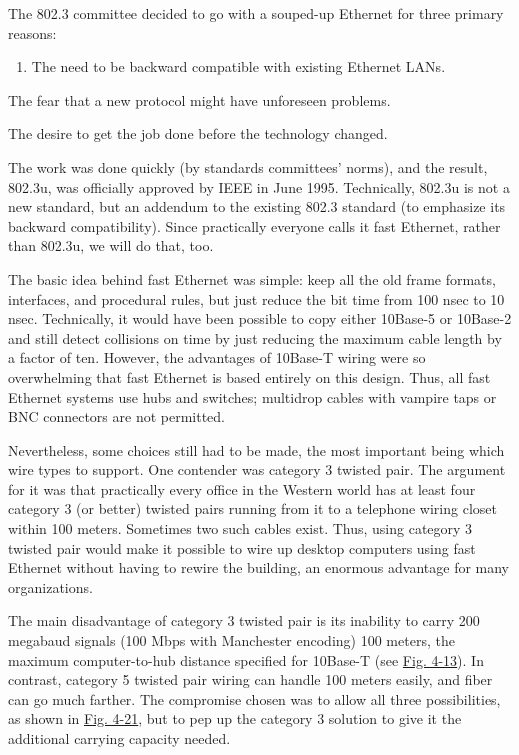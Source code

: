 \documentclass[b5paper,11pt]{memoir}
\begin{document}
The 802.3 committee decided to go with a souped-up Ethernet for three
primary reasons:

{}

\begin{enumerate}
\def\labelenumi{\arabic{enumi}.}
\item
  {}

  The need to be backward compatible with existing Ethernet LANs.
\end{enumerate}

{}

The fear that a new protocol might have unforeseen problems.

{}

The desire to get the job done before the technology changed.

The work was done quickly (by standards committees' norms), and the
result, {802.3u}, was officially approved by IEEE in June 1995.
Technically, 802.3u is not a new standard, but an addendum to the
existing 802.3 standard (to emphasize its backward compatibility). Since
practically everyone calls it {fast Ethernet}, rather than 802.3u, we
will do that, too.

The basic idea behind fast Ethernet was simple: keep all the old frame
formats, interfaces, and procedural rules, but just reduce the bit time
from 100 nsec to 10 nsec. Technically, it would have been possible to
copy either 10Base-5 or 10Base-2 and still detect collisions on time by
just reducing the maximum cable length by a factor of ten. However, the
advantages of 10Base-T wiring were so overwhelming that fast Ethernet is
based entirely on this design. Thus, all fast Ethernet systems use hubs
and switches; multidrop cables with vampire taps or BNC connectors are
not permitted.

Nevertheless, some choices still had to be made, the most important
being which wire types to support. One contender was category 3 twisted
pair. The argument for it was that practically every office in the
Western world has at least four category 3 (or better) twisted pairs
running from it to a telephone wiring closet within 100 meters.
Sometimes two such cables exist. Thus, using category 3 twisted pair
would make it possible to wire up desktop computers using fast Ethernet
without having to rewire the building, an enormous advantage for many
organizations.

The main disadvantage of category 3 twisted pair is its inability to
carry 200 megabaud signals (100 Mbps with Manchester encoding) 100
meters, the maximum computer-to-hub distance specified for 10Base-T (see
\protect\hyperlink{0130661023_ch04lev1sec3.htmlux5cux23ch04fig13}{Fig.
4-13}). In contrast, category 5 twisted pair wiring can handle 100
meters easily, and fiber can go much farther. The compromise chosen was
to allow all three possibilities, as shown in
\protect\hyperlink{0130661023_ch04lev1sec3.htmlux5cux23ch04fig21}{Fig.
4-21}, but to pep up the category 3 solution to give it the additional
carrying capacity needed.
\end{document}
